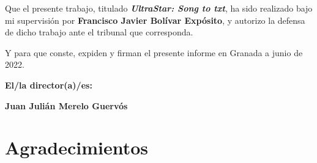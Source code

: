 Que el presente trabajo, titulado \textit{\textbf{UltraStar: Song to txt}},
ha sido realizado bajo mi supervisión por \textbf{Francisco Javier Bolívar Expósito}, y autorizo la defensa de dicho trabajo ante el tribunal
que corresponda.

\vspace{0.5cm}

Y para que conste, expiden y firman el presente informe en Granada a junio de 2022.

\vspace{1cm}

\textbf{El/la director(a)/es: }

\vspace{5cm}

\noindent \textbf{Juan Julián Merelo Guervós}

\chapter*{Agradecimientos}




